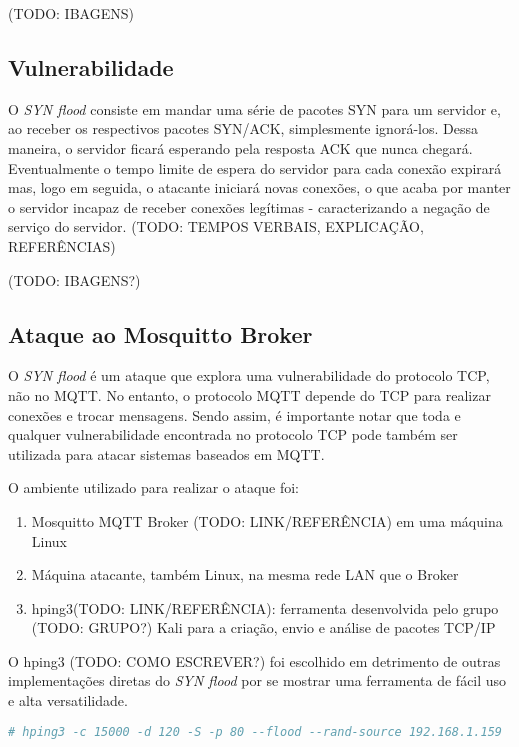 (TODO: IBAGENS)



\subsection{Vulnerabilidade}

O \emph{SYN flood} consiste em mandar uma série de pacotes SYN para um servidor e, ao receber os respectivos pacotes SYN/ACK, simplesmente ignorá-los. Dessa maneira, o servidor ficará esperando pela resposta ACK que nunca chegará. Eventualmente o tempo limite de espera do servidor para cada conexão expirará mas, logo em seguida, o atacante iniciará novas conexões, o que acaba por manter o servidor incapaz de receber conexões legítimas \-- caracterizando a negação de serviço do servidor. (TODO: TEMPOS VERBAIS, EXPLICAÇÃO, REFERÊNCIAS)


(TODO: IBAGENS?)


\subsection{Ataque ao Mosquitto Broker}
O \emph{SYN flood} é um ataque que explora uma vulnerabilidade do protocolo TCP, não no MQTT. No entanto, o protocolo MQTT depende do TCP para realizar conexões e trocar mensagens. Sendo assim, é importante notar que toda e qualquer vulnerabilidade encontrada no protocolo TCP pode também ser utilizada para atacar sistemas baseados em MQTT.

O ambiente utilizado para realizar o ataque foi:
\begin{enumerate}
    \item Mosquitto MQTT Broker (TODO: LINK/REFERÊNCIA) em uma máquina Linux
    
    \item Máquina atacante, também Linux, na mesma rede LAN que o Broker
    
    \item hping3(TODO: LINK/REFERÊNCIA): ferramenta desenvolvida pelo grupo (TODO: GRUPO?) Kali para a criação, envio e análise de pacotes TCP/IP
\end{enumerate}

O hping3 (TODO: COMO ESCREVER?) foi escolhido em detrimento de outras implementações diretas do \emph{SYN flood} por se mostrar uma ferramenta de fácil uso e alta versatilidade. 




\begin{lstlisting}[language=bash]
# hping3 -c 15000 -d 120 -S -p 80 --flood --rand-source 192.168.1.159
\end{lstlisting}



